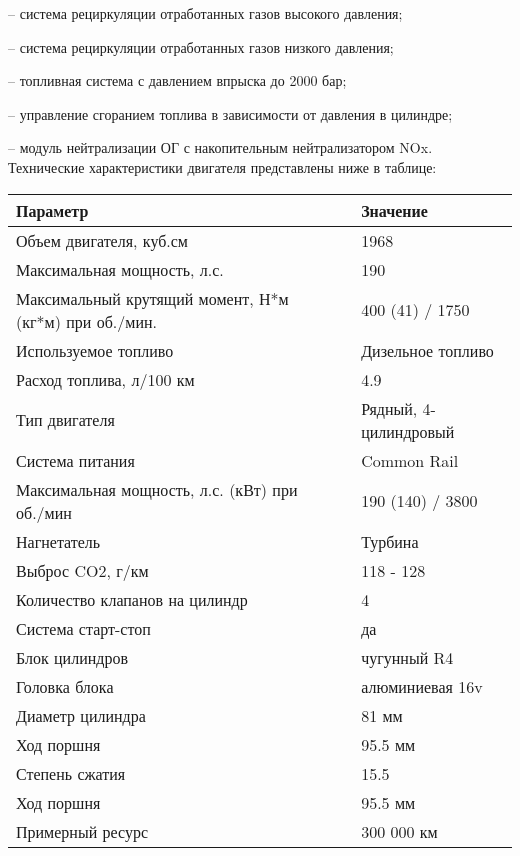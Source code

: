 { -- система рециркуляции отработанных газов высокого давления;
 
 -- система рециркуляции отработанных газов низкого давления;
 
 -- топливная система с давлением впрыска до 2000 бар;
 
 -- управление сгоранием топлива в зависимости от давления в цилиндре;
 
 -- модуль нейтрализации ОГ с накопительным нейтрализатором NOx.\\
 
Технические характеристики двигателя представлены ниже в таблице:
 
 \begin{center}
 	\begin{tabulary}{\textwidth}{LCL}
 		\hline 
 		\textbf{Параметр}      &   & \textbf{Значение}\\
 		\hline    
 		Объем двигателя, куб.см     &   &    	1968\\
 		Максимальная мощность, л.с.   &   &    	190 \\
 	Максимальный крутящий момент, Н*м (кг*м) при об./мин. & & 400 (41) / 1750 \\
 		Используемое топливо & &    Дизельное топливо\\
 		Расход топлива, л/100 км   & &     4.9\\
 		Тип двигателя   & &    Рядный, 4-цилиндровый\\
 	Система питания  & &    Common Rail\\
 	Максимальная мощность, л.с. (кВт) при об./мин   & &    190 (140) / 3800\\
 		Нагнетатель   & &     Турбина\\
 		Выброс CO2, г/км   & &     118 - 128\\
 		Количество клапанов на цилиндр  & &    4\\
 				Система старт-стоп   & &     да\\
 				Блок цилиндров   &   &    	чугунный R4 \\
 						Головка блока   &   &    	алюминиевая 16v \\
 						Диаметр цилиндра   &   &    81 мм \\
 						Ход поршня  &   &    95.5 мм \\
 							Степень сжатия &   &    15.5\\
 								Ход поршня  &   &    95.5 мм \\
 								Примерный ресурс  &   &    300 000 км \\
 	\end{tabulary}  
 \end{center}
  
}
